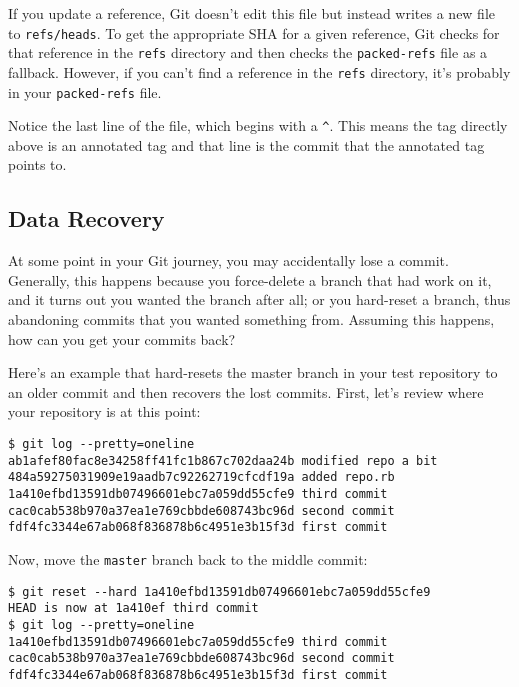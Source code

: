 \documentclass[a4paper]{book}
\begin{document}
If you update a reference, Git doesn't edit this file but instead writes a new file to \texttt{refs/heads}. To get the appropriate SHA for a given reference, Git checks for that reference in the \texttt{refs} directory and then checks the \texttt{packed-refs} file as a fallback. However, if you can't find a reference in the \texttt{refs} directory, it's probably in your \texttt{packed-refs} file.

Notice the last line of the file, which begins with a \texttt{\^{}}. This means the tag directly above is an annotated tag and that line is the commit that the annotated tag points to.

\subsection{Data Recovery}\label{data-recovery}

At some point in your Git journey, you may accidentally lose a commit. Generally, this happens because you force-delete a branch that had work on it, and it turns out you wanted the branch after all; or you hard-reset a branch, thus abandoning commits that you wanted something from. Assuming this happens, how can you get your commits back?

Here's an example that hard-resets the master branch in your test repository to an older commit and then recovers the lost commits. First, let's review where your repository is at this point:

\begin{shaded}\begin{verbatim}
$ git log --pretty=oneline
ab1afef80fac8e34258ff41fc1b867c702daa24b modified repo a bit
484a59275031909e19aadb7c92262719cfcdf19a added repo.rb
1a410efbd13591db07496601ebc7a059dd55cfe9 third commit
cac0cab538b970a37ea1e769cbbde608743bc96d second commit
fdf4fc3344e67ab068f836878b6c4951e3b15f3d first commit
\end{verbatim}\end{shaded}

Now, move the \texttt{master} branch back to the middle commit:

\begin{shaded}\begin{verbatim}
$ git reset --hard 1a410efbd13591db07496601ebc7a059dd55cfe9
HEAD is now at 1a410ef third commit
$ git log --pretty=oneline
1a410efbd13591db07496601ebc7a059dd55cfe9 third commit
cac0cab538b970a37ea1e769cbbde608743bc96d second commit
fdf4fc3344e67ab068f836878b6c4951e3b15f3d first commit
\end{verbatim}\end{shaded}
\end{document}
